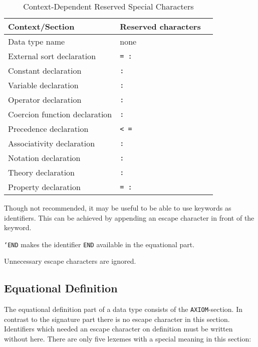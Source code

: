 \begin{description}
\begin{table}[htbp]
\begin{center}
\begin{tabular}{|l|l|l|}
\hline
Context/Section & Reserved characters\\ \hline
\hline
Data type name & none \\ \hline
External sort declaration & {\tt\verb!= :!} \\ \hline
Constant declaration & {\tt\verb!:!} \\ \hline
Variable declaration & {\tt\verb!:!} \\ \hline
Operator declaration & {\tt\verb!:!} \\ \hline
Coercion function declaration & {\tt\verb!:!} \\ \hline
Precedence declaration & {\tt\verb!< =!} \\ \hline
Associativity declaration & {\tt\verb!:!} \\ \hline
Notation declaration & {\tt\verb!:!} \\ \hline
Theory declaration & {\tt\verb!:!} \\ \hline
Property declaration & {\tt\verb!= :!} \\ \hline
\end{tabular}
\end{center}
\caption{Context-Dependent Reserved Special Characters}
\label{contdep}
\end{table}

Though not recommended, it may be useful to be able to use keywords as identifiers.
This can be achieved by appending an escape character in front of the keyword.
\begin{example}
{\rm {\tt`END} makes the identifier {\tt END} available in the equational part.}
\end{example}

Unnecessary escape characters are ignored.

\end{description}

\subsection{Equational Definition}
The equational definition part of a data type consists of the {\tt AXIOM}-section.
In contrast to the signature part there is no escape character
in this section. Identifiers which needed an escape character on definition
must be written without here. There are only five lexemes with a special
meaning in this section:

